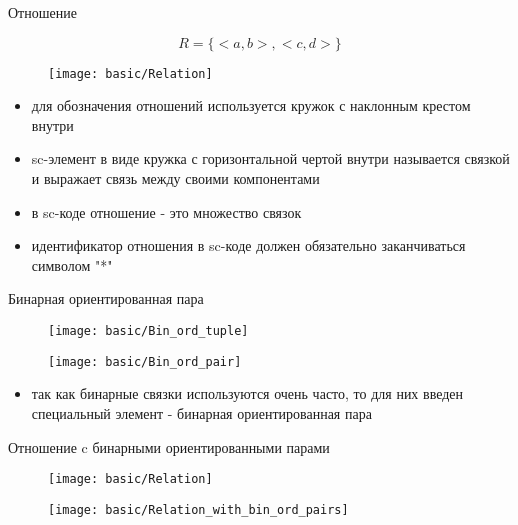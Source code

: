 \begin{frame}[shrink=20]{Отношение}
  \begin{center}
    \[ R = \{ <a, b>, <c, d> \} \]
    
    \objeqv

    \begin{figure}
      \texttt{[image: basic/Relation]}
    \end{figure}

    \begin{itemize}
    \item для обозначения отношений используется кружок с наклонным
      крестом внутри
    \item sc-элемент в виде кружка с горизонтальной чертой внутри
      называется связкой и выражает связь между своими компонентами
    \item в sc-коде отношение - это множество связок
    \item идентификатор отношения в sc-коде должен обязательно
      заканчиваться символом "*"
    \end{itemize}
  \end{center}
\end{frame}

\begin{frame}{Бинарная ориентированная пара}
  \begin{center}
    \begin{figure}
      \texttt{[image: basic/Bin\_ord\_tuple]}
    \end{figure}

    \objeqv

    \begin{figure}
      \texttt{[image: basic/Bin\_ord\_pair]}
    \end{figure}
  \end{center}

  \begin{itemize}
  \item так как бинарные связки используются очень часто, то для них
    введен специальный элемент - бинарная ориентированная пара
  \end{itemize}
\end{frame}

\begin{frame}{Отношение c бинарными ориентированными парами}
  \begin{center}
    \begin{figure}
      \texttt{[image: basic/Relation]}
    \end{figure}
    
    \objeqv

    \begin{figure}
      \texttt{[image: basic/Relation\_with\_bin\_ord\_pairs]}
    \end{figure}
  \end{center}
\end{frame}

